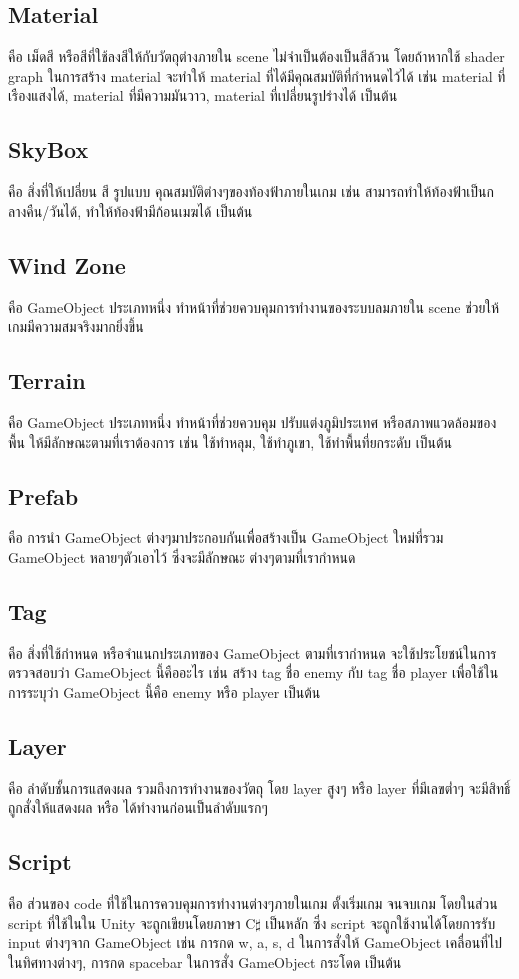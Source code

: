 \subsection{Material}
คือ เม็ดสี หรือสีที่ใช้ลงสีให้กับวัตถุต่างภายใน scene ไม่จำเป็นต้องเป็นสีล้วน โดยถ้าหากใช้ shader graph
ในการสร้าง material จะทำให้ material ที่ได้มีคุณสมบัติที่กำหนดไว้ได้ เช่น material ที่เรืองแสงได้, 
material ที่มีความมันวาว, material ที่เปลี่ยนรูปร่างได้ เป็นต้น
\subsection{SkyBox}
คือ สิ่งที่ให้เปลี่ยน สี รูปแบบ คุณสมบัติต่างๆของท้องฟ้าภายในเกม เช่น สามารถทำให้ท้องฟ้าเป็นกลางคืน/วันได้,
ทำให้ท้องฟ้ามีก้อนเมฆได้ เป็นต้น
\subsection{Wind Zone}
คือ GameObject ประเภทหนึ่ง ทำหน้าที่ช่วยควบคุมการทำงานของระบบลมภายใน scene ช่วยให้เกมมีความสมจริงมากยิ่งขึ้น
\subsection{Terrain}
คือ GameObject ประเภทหนึ่ง ทำหน้าที่ช่วยควบคุม ปรับแต่งภูมิประเทศ หรือสภาพแวดล้อมของพื้น ให้มีลักษณะตามที่เราต้องการ
เช่น ใช้ทำหลุม, ใช้ทำภูเขา, ใช้ทำพื้นที่ยกระดับ เป็นต้น
\subsection{Prefab}
คือ การนำ GameObject ต่างๆมาประกอบกันเพื่อสร้างเป็น GameObject ใหม่ที่รวม GameObject หลายๆตัวเอาไว้ ซึ่งจะมีลักษณะ
ต่างๆตามที่เรากำหนด
\subsection{Tag}
คือ สิ่งที่ใช้กำหนด หรือจำแนกประเภทของ GameObject ตามที่เรากำหนด จะใช้ประโยชน์ในการตรวจสอบว่า GameObject นี้คืออะไร 
เช่น สร้าง tag ชื่อ enemy กับ tag ชื่อ player เพื่อใช้ในการระบุว่า GameObject นี้คือ enemy หรือ player เป็นต้น 
\subsection{Layer}
คือ ลำดับชั้นการแสดงผล รวมถึงการทำงานของวัตถุ โดย layer สูงๆ หรือ layer ที่มีเลขต่ำๆ จะมีสิทธิ์ถูกสั่งให้แสดงผล 
หรือ ได้ทำงานก่อนเป็นลำดับแรกๆ
\subsection{Script}
คือ ส่วนของ code ที่ใช้ในการควบคุมการทำงานต่างๆภายในเกม ตั้งเริ่มเกม จนจบเกม โดยในส่วน script ที่ใช้ในใน Unity
จะถูกเขียนโดยภาษา C$\sharp$ เป็นหลัก ซึ่ง script จะถูกใช้งานได้โดยการรับ input ต่างๆจาก GameObject เช่น 
การกด w, a, s, d ในการสั่งให้ GameObject เคลื่อนที่ไปในทิศทางต่างๆ, การกด spacebar ในการสั่ง GameObject กระโดด เป็นต้น

